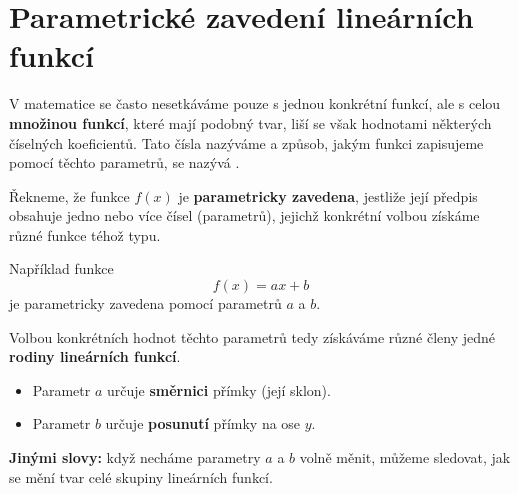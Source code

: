\documentclass[12pt,a4paper]{article}
\begin{document}
\section{Parametrické zavedení lineárních funkcí}

V matematice se často nesetkáváme pouze s jednou konkrétní funkcí,  
ale s celou \textbf{množinou funkcí}, které mají podobný tvar,  
liší se však hodnotami některých číselných koeficientů.  
Tato čísla nazýváme  a způsob, jakým funkci zapisujeme pomocí těchto parametrů,  
se nazývá .

\begin{definitionbox}
Řekneme, že funkce \(f(x)\) je \textbf{parametricky zavedena},  
jestliže její předpis obsahuje jedno nebo více čísel (parametrů),  
jejichž konkrétní volbou získáme různé funkce téhož typu.

Například funkce
\[
f(x) = a x + b
\]
je parametricky zavedena pomocí parametrů \(a\) a \(b\).
\end{definitionbox}

Volbou konkrétních hodnot těchto parametrů tedy získáváme různé členy jedné \textbf{rodiny lineárních funkcí}.

\begin{itemize}
    \item Parametr \(a\) určuje \textbf{směrnici} přímky (její sklon).  
    \item Parametr \(b\) určuje \textbf{posunutí} přímky na ose \(y\).
\end{itemize}

\medskip
\textbf{Jinými slovy:} když necháme parametry \(a\) a \(b\) volně měnit,  
můžeme sledovat, jak se mění tvar celé skupiny lineárních funkcí.
\end{document}
